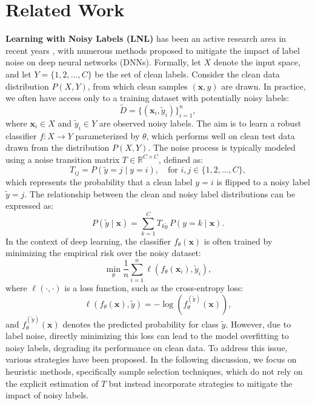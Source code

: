 \section{Related Work}
\label{appendix:A}
\textbf{Learning with Noisy Labels (LNL)} has been an active research area in recent years \cite{li2024transferring, wang2024tackling, xia2023regularly, xia2022extended, 9784878, 10689264, baek2024sam, englesson2024robust}, with numerous methods proposed to mitigate the impact of label noise on deep neural networks (DNNs). Formally, let \( X \) denote the input space, and let \( Y = \{1, 2, \dots, C\} \) be the set of clean labels. Consider the clean data distribution \( P(X, Y) \), from which clean samples \( (\mathbf{x}, y) \) are drawn. In practice, we often have access only to a training dataset with potentially noisy labels:
\begin{equation}
\tilde{D} = \{(\mathbf{x}_i, \tilde{y}_i)\}_{i=1}^n,
\end{equation}
where \( \mathbf{x}_i \in X \) and \( \tilde{y}_i \in Y \) are observed noisy labels. The aim is to learn a robust classifier \( f: X \rightarrow Y \) parameterized by \( \theta \), which performs well on clean test data drawn from the distribution \( P(X, Y) \).
The noise process is typically modeled using a noise transition matrix \( T \in \mathbb{R}^{C \times C} \), defined as:
\begin{equation}
T_{ij} = P(\tilde{y} = j \mid y = i), \quad \text{for } i, j \in \{1, 2, \dots, C\},
\end{equation}
which represents the probability that a clean label \( y = i \) is flipped to a noisy label \( \tilde{y} = j \). The relationship between the clean and noisy label distributions can be expressed as:
\begin{equation}
P(\tilde{y} \mid \mathbf{x}) = \sum_{k=1}^C T_{k\tilde{y}} \, P(y = k \mid \mathbf{x}).
\end{equation}
In the context of deep learning, the classifier \( f_\theta(\mathbf{x}) \) is often trained by minimizing the empirical risk over the noisy dataset:
\begin{equation}
\min_{\theta} \frac{1}{n} \sum_{i=1}^n \ell\left(f_\theta(\mathbf{x}_i), \tilde{y}_i\right),
\end{equation}
where \( \ell(\cdot, \cdot) \) is a loss function, such as the cross-entropy loss:
\begin{equation}
\ell\left(f_\theta(\mathbf{x}), \tilde{y}\right) = -\log \left( f_\theta^{(\tilde{y})}(\mathbf{x}) \right),
\end{equation}
and \( f_\theta^{(\tilde{y})}(\mathbf{x}) \) denotes the predicted probability for class \( \tilde{y} \). However, due to label noise, directly minimizing this loss can lead to the model overfitting to noisy labels, degrading its performance on clean data. To address this issue, various strategies have been proposed.
In the following discussion, we focus on heuristic methods, specifically sample selection techniques, which do not rely on the explicit estimation of \( T \) but instead incorporate strategies to mitigate the impact of noisy labels.

